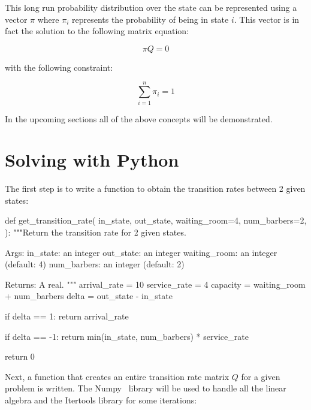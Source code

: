 This long run probability distribution over the state can be represented using a
vector \(\pi\) where \(\pi_i\) represents the probability of being in state
\(i\). This vector is in fact the solution to the following matrix equation:

\begin{equation}
    \pi Q = 0
    \label{eqn:continuous_time_markov_process_steady_state}
\end{equation}

with the following constraint:

\begin{equation}
    \sum_{i=1}^{n}\pi_i = 1
\end{equation}

In the upcoming sections all of the above concepts will be demonstrated.

\section{Solving with Python}\label{sec:markov_chains_solving-with-python}

The first step is to write a function to obtain the transition
rates between 2 given states:


\begin{pyin}
def get_transition_rate(
    in_state,
    out_state,
    waiting_room=4,
    num_barbers=2,
):
    """Return the transition rate for 2 given states.

    Args:
        in_state: an integer
        out_state: an integer
        waiting_room: an integer (default: 4)
        num_barbers:  an integer (default: 2)

    Returns:
        A real.
    """
    arrival_rate = 10
    service_rate = 4
    capacity = waiting_room + num_barbers
    delta = out_state - in_state

    if delta == 1:
        return arrival_rate

    if delta == -1:
        return min(in_state, num_barbers) * service_rate

    return 0
\end{pyin}

Next, a function that creates an entire transition rate matrix \(Q\) for a given
problem is written. The Numpy~\cite{harris2020array} library will be used to
handle all the linear algebra and the Itertools library for
some iterations:

